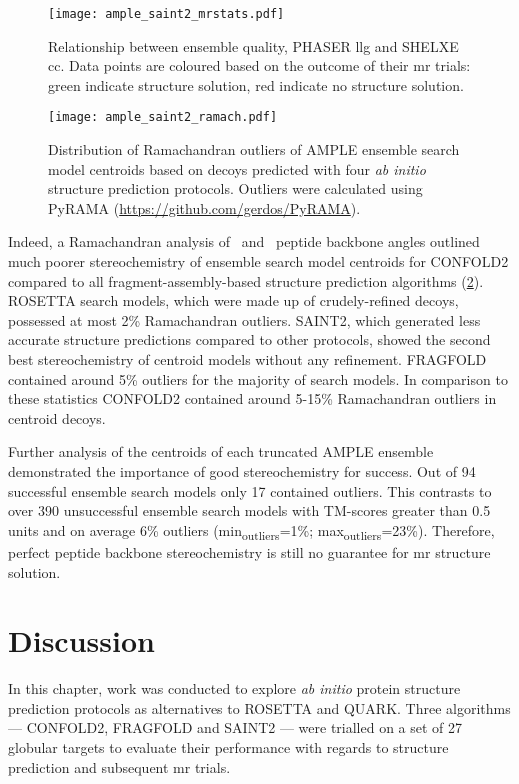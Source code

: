 \begin{figure}[H]
    \centering
    \texttt{[image: ample\_saint2\_mrstats.pdf]}
    \caption[Relationship between ensemble metrics]{Relationship between ensemble quality, PHASER \gls{llg} and SHELXE \gls{cc}. Data points are coloured based on the outcome of their \gls{mr} trials: green indicate structure solution, red indicate no structure solution.}
    \label{fig:ample_saint2_mrstats}
\end{figure}

\begin{figure}[H]
    \centering
    \texttt{[image: ample\_saint2\_ramach.pdf]}
    \caption[Ramachandran outliers of ensemble search model centroids]{Distribution of Ramachandran outliers of AMPLE ensemble search model centroids based on decoys predicted with four \textit{ab initio} structure prediction protocols. Outliers were calculated using PyRAMA (\href{https://github.com/gerdos/PyRAMA}{https://github.com/gerdos/PyRAMA}).}
    \label{fig:ample_saint2_ramach}
\end{figure}

Indeed, a Ramachandran analysis of \textphi\ and \textpsi\ peptide backbone angles outlined much poorer stereochemistry of ensemble search model centroids for CONFOLD2 compared to all fragment-assembly-based structure prediction algorithms (\cref{fig:ample_saint2_ramach}). ROSETTA search models, which were made up of crudely-refined decoys, possessed at most 2\% Ramachandran outliers. SAINT2, which generated less accurate structure predictions compared to other protocols, showed the second best stereochemistry of centroid models without any refinement.  FRAGFOLD contained around 5\% outliers for the majority of search models. In comparison to these statistics CONFOLD2 contained around 5-15\% Ramachandran outliers in centroid decoys. 

Further analysis of the centroids of each truncated AMPLE ensemble demonstrated the importance of good stereochemistry for success. Out of 94 successful ensemble search models only 17 contained outliers. This contrasts to over 390 unsuccessful ensemble search models with TM-scores greater than 0.5 units and on average 6\% outliers (min\textsubscript{outliers}=1\%; max\textsubscript{outliers}=23\%). Therefore, perfect peptide backbone stereochemistry is still no guarantee for \gls{mr} structure solution. 

\section{Discussion}
In this chapter, work was conducted to explore \textit{ab initio} protein structure prediction protocols as alternatives to ROSETTA and QUARK. Three algorithms --- CONFOLD2, FRAGFOLD and SAINT2 --- were trialled on a set of 27 globular targets to evaluate their performance with regards to structure prediction and subsequent \gls{mr} trials.

